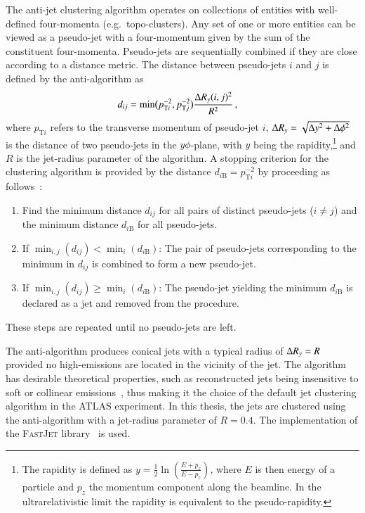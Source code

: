 The anti-\kt jet clustering algorithm operates on collections of entities with
well-defined four-momenta (e.g.\ topo-clusters). Any set of one or more entities
can be viewed as a pseudo-jet with a four-momentum given by the sum of the
constituent four-momenta. Pseudo-jets are sequentially combined if they are
close according to a distance metric. The distance between pseudo-jets $i$ and
$j$ is defined by the anti-\kt algorithm as~\cite{Cacciari:2008gp}
\begin{align*}
  d_{ij} &= \min\bigl( p_{\text{T}i}^{-2}, p_{\text{T}j}^{-2} \bigr)
           \frac{ \Delta R_y(i, j)^2 }{ R^2 } \,\text{,}
\end{align*}
where $p_{\text{T}i}$ refers to the transverse momentum of pseudo-jet $i$,
$\Delta R_y = \sqrt{\Delta y^2 + \Delta \phi^2}$ is the distance of two pseudo-jets in
the $y\phi$-plane, with $y$ being the rapidity,\footnote{The rapidity is defined
  as $y = \frac{1}{2} \ln \left( \frac{E + p_z}{E - p_z} \right)$, where $E$ is
  then energy of a particle and $p_z$ the momentum component along the
  beamline. In the ultrarelativistic limit the rapidity is equivalent to the
  pseudo-rapidity.} and $R$ is the jet-radius parameter of the algorithm. A
stopping criterion for the clustering algorithm is provided by the distance
$d_{i\text{B}} = p_{\text{T}i}^{-2}$ by proceeding as
follows~\cite{Cacciari:2008gp}:
\begin{enumerate}
\item Find the minimum distance $d_{ij}$ for all pairs of distinct pseudo-jets
  ($i \neq j$) and the minimum distance $d_{i\text{B}}$ for all pseudo-jets.

\item If $\min_{i,j}(d_{ij}) < \min_{i}(d_{i\text{B}})$: The pair of pseudo-jets
  corresponding to the minimum in $d_{ij}$ is combined to form a new pseudo-jet.

\item If $\min_{i,j}(d_{ij}) \geq \min_{i}(d_{i\text{B}})$: The pseudo-jet
  yielding the minimum $d_{i\text{B}}$ is declared as a jet and removed from the
  procedure.
\end{enumerate}
These steps are repeated until no pseudo-jets are left.

The anti-\kt algorithm produces conical jets with a typical radius of $\Delta R_y = R$
provided no high-\pT emissions are located in the vicinity of the jet. The
algorithm has desirable theoretical properties, such as reconstructed jets being
insensitive to soft or collinear emissions~\cite{Cacciari:2008gp}, thus making
it the choice of the default jet clustering algorithm in the ATLAS
experiment. In this thesis, the jets are clustered using the anti-\kt algorithm
with a jet-radius parameter of $R = 0.4$. The implementation of the
\textsc{FastJet} library~\cite{Fastjet} is used.


